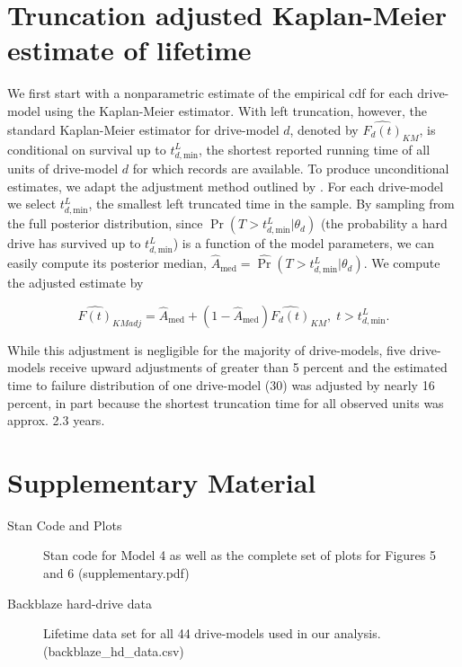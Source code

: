 \documentclass[12pt]{article}
\begin{document}
\clearpage

\appendix
\section{Truncation adjusted Kaplan-Meier estimate of lifetime}
\label{sec:trunc-adj}
We first start with a nonparametric estimate of the empirical cdf for each drive-model using the Kaplan-Meier estimator.  With left truncation, however, the standard Kaplan-Meier estimator for drive-model $d$, denoted by
$\widehat{F_d(t)}_{KM}$, is conditional on survival up to
$t_{d,\text{min}}^L$, the shortest reported running time of all units
of drive-model $d$ for which records are available. To produce
unconditional estimates, we adapt the adjustment method outlined by \citet[Chapter 11]{meeker}.  For each drive-model we select
$t_{d,\text{min}}^L$, the smallest left truncated time in the sample.
By sampling from the full posterior distribution, since
$\Pr(T>t_{d,\text{min}}^L|\theta_d)$ (the probability a hard drive has
survived up to $t_{d,\text{min}}^L$) is a function of the model
parameters, we can easily compute its posterior median,
$\widehat{A}_{\text{med}} = \widehat{\Pr}(T>t_{d,\text{min}}^L|\theta_d)$. We compute the adjusted estimate by

$$\widehat{F(t)}_{KMadj} = \widehat{A}_{\text{med}} + \left(1 - \widehat{A}_{\text{med}}\right)\widehat{F_d(t)}_{KM},\; t>t_{d,\text{min}}^L.$$

While this adjustment is negligible for the majority of drive-models, five drive-models receive upward adjustments of greater than 5 percent and the estimated time to failure distribution of one drive-model (30) was adjusted by nearly 16 percent, in part because the shortest truncation time for all observed units was approx. 2.3 years.

\section{Supplementary Material}
\label{sec:supple}

\begin{description}

\item[Stan Code and Plots] Stan code for Model 4 as well as the complete set of plots for Figures 5 and 6 (supplementary.pdf)

\item[Backblaze hard-drive data] Lifetime data set for all 44 drive-models used in our analysis. (backblaze\_hd\_data.csv)

\end{description}



\end{document}
